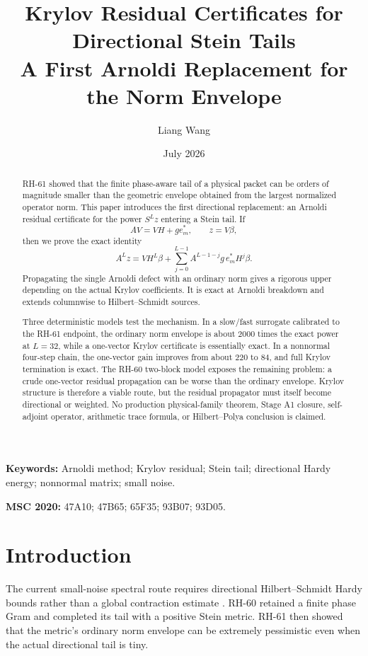 \documentclass[11pt]{article}
\title{Krylov Residual Certificates for Directional Stein Tails\\
\large A First Arnoldi Replacement for the Norm Envelope}
\author{Liang Wang}
\date{July 2026}
\begin{document}
\maketitle

\begin{abstract}
RH-61 showed that the finite phase-aware tail of a physical packet can be
orders of magnitude smaller than the geometric envelope obtained from the
largest normalized operator norm.  This paper introduces the first
directional replacement: an Arnoldi residual certificate for the power
$S^Lz$ entering a Stein tail.  If
\[
 AV=VH+ge_m^*,
 \qquad z=V\beta,
\]
then we prove the exact identity
\[
 A^Lz=VH^L\beta+
 \sum_{j=0}^{L-1}A^{L-1-j}g\,e_m^*H^j\beta.
\]
Propagating the single Arnoldi defect with an ordinary norm gives a
rigorous upper depending on the actual Krylov coefficients.  It is exact at
Arnoldi breakdown and extends columnwise to Hilbert--Schmidt sources.

Three deterministic models test the mechanism.  In a slow/fast surrogate
calibrated to the RH-61 endpoint, the ordinary norm envelope is about
$2000$ times the exact power at $L=32$, while a one-vector Krylov
certificate is essentially exact.  In a nonnormal four-step chain, the
one-vector gain improves from about $220$ to $84$, and full Krylov
termination is exact.  The RH-60 two-block model exposes the remaining
problem: a crude one-vector residual propagation can be worse than the
ordinary envelope.  Krylov structure is therefore a viable route, but the
residual propagator must itself become directional or weighted.  No
production physical-family theorem, Stage A1 closure, self-adjoint operator,
arithmetic trace formula, or Hilbert--Polya conclusion is claimed.
\end{abstract}

\noindent\textbf{Keywords:} Arnoldi method; Krylov residual; Stein tail;
directional Hardy energy; nonnormal matrix; small noise.

\medskip
\noindent\textbf{MSC 2020:} 47A10; 47B65; 65F35; 93B07; 93D05.

\section{Introduction}

The current small-noise spectral route requires directional
Hilbert--Schmidt Hardy bounds rather than a global contraction estimate
\citep{WangHardy2026}.  RH-60 retained a finite phase Gram and completed its
tail with a positive Stein metric.  RH-61 then showed that the metric's
ordinary norm envelope can be extremely pessimistic even when the actual
directional tail is tiny.
\end{document}
